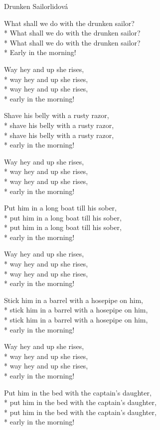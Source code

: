 \documentclass[10.5pt]{book}
\begin{document}
\begin{poem}{Drunken Sailor}{lidová}

\settowidth{\versewidth}{Put him in the bed with the captains daughter,}

What shall we do with the drunken sailor?\\*
What shall we do with the drunken sailor?\\*
What shall we do with the drunken sailor?\\*
Early in the morning!

Way hey and up she rises,\\*
way hey and up she rises,\\*
way hey and up she rises,\\*
early in the morning!

Shave his belly with a rusty razor,\\*
shave his belly with a rusty razor,\\*
shave his belly with a rusty razor,\\*
early in the morning!

Way hey and up she rises,\\*
way hey and up she rises,\\*
way hey and up she rises,\\*
early in the morning!

Put him in a long boat till his sober,\\*
put him in a long boat till his sober,\\*
put him in a long boat till his sober,\\*
early in the morning!

Way hey and up she rises,\\*
way hey and up she rises,\\*
way hey and up she rises,\\*
early in the morning!

Stick him in a barrel with a hosepipe on him,\\*
stick him in a barrel with a hosepipe on him,\\*
stick him in a barrel with a hosepipe on him,\\*
early in the morning!

Way hey and up she rises,\\*
way hey and up she rises,\\*
way hey and up she rises,\\*
early in the morning!

Put him in the bed with the captain's daughter,\\*
put him in the bed with the captain's daughter,\\*
put him in the bed with the captain's daughter,\\*
early in the morning!


\end{poem}
\end{document}
